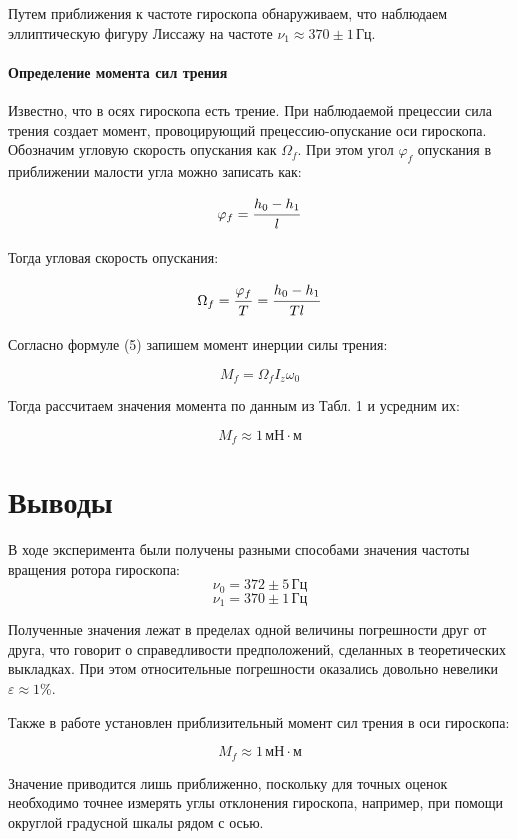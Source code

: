 \documentclass[12pt,a4paper]{scrartcl}
\begin{document}
	\par Путем приближения к частоте гироскопа обнаруживаем, что наблюдаем эллиптическую фигуру Лиссажу на частоте $\nu_1 \approx 370 \pm 1\, \text{Гц}$.
	
	\paragraph{Определение момента сил трения} \hfill
	
	\par Известно, что в осях гироскопа есть трение. При наблюдаемой прецессии сила трения создает момент, провоцирующий прецессию-опускание оси гироскопа. Обозначим угловую скорость опускания как $\Omega_f$. При этом угол $\varphi_f$ опускания в приближении малости угла можно записать как:
	
	$$\varphi_f = \dfrac{\strut h_0 - h_1}{\strut l}$$
	
	Тогда угловая скорость опускания:
	
	$$\Omega_f = \dfrac{\strut \varphi_f}{\strut T} = \dfrac{\strut h_0 - h_1}{\strut Tl}$$
	
	Согласно формуле (5) запишем момент инерции силы трения:
	
	$$M_f = \Omega_f I_z \omega_0$$
	
	Тогда рассчитаем значения момента по данным из Табл. 1 и усредним их:
	
	$$M_f \approx 1\,\text{мН} \cdot\text{м}$$

	\section{Выводы}
	В ходе эксперимента были получены разными способами значения частоты вращения ротора гироскопа:
	\begin{equation*}
		\nu_0 = 372 \pm 5\, \text{Гц}
	\end{equation*}
	\begin{equation*}
		\nu_1 = 370 \pm 1\, \text{Гц}
	\end{equation*}
	
	Полученные значения лежат в пределах одной величины погрешности друг от друга, что говорит о справедливости предположений, сделанных в теоретических выкладках. При этом относительные погрешности оказались довольно невелики $\varepsilon \approx 1\%$.
	
	Также в работе установлен приблизительный момент сил трения в оси гироскопа:
	
	$$M_f \approx 1\,\text{мН} \cdot\text{м}$$
	
	Значение приводится лишь приближенно, поскольку для точных оценок необходимо точнее измерять углы отклонения гироскопа, например, при помощи округлой градусной шкалы рядом с осью.	
\end{document}
